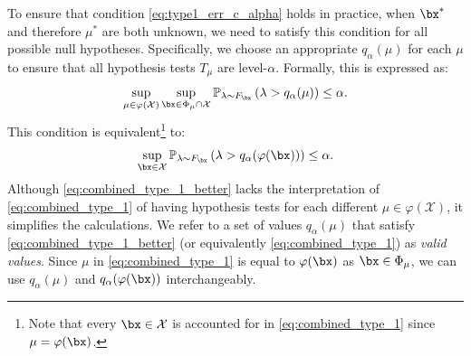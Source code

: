\documentclass[11pt]{article}
\numberwithin{equation}{section}
\numberwithin{figure}{section}
\begin{document}
To ensure that condition \eqref{eq:type1_err_c_alpha} holds in practice, when $\bx^*$ and therefore $\mu^*$ are both unknown, we need to satisfy this condition for all possible null hypotheses.
Specifically, we choose an appropriate $q_\alpha(\mu)$ for each $\mu$ to ensure that all hypothesis tests $T_\mu$ are level-$\alpha$.
Formally, this is expressed as:
\begin{equation} \label{eq:combined_type_1}
   \sup_{\mu \in \varphi(\mathcal X)} \sup_{\bx \in \Phi_\mu \cap \mathcal{X}} \mathbb{P}_{\lambda \sim F_{\bx}} \left(\lambda> q_\alpha(\mu) \right) \leq \alpha.
\end{equation}
This condition is equivalent\footnote{
Note that every $\bx \in \mathcal{X}$ is accounted for in \eqref{eq:combined_type_1} since $\mu = \varphi(\bx)$. 
} to: 
\begin{equation} \label{eq:combined_type_1_better}
  \sup_{\bx \in \mathcal{X}} \mathbb{P}_{\lambda \sim F_{\bx}} \left(\lambda> q_\alpha(\varphi(\bx)) \right) \leq \alpha.
\end{equation}
Although \eqref{eq:combined_type_1_better} lacks the interpretation of \eqref{eq:combined_type_1} of having hypothesis tests for each different $\mu \in \varphi(\mathcal{X})$, it simplifies the calculations. 
We refer to a set of values $q_\alpha(\mu)$ that satisfy \eqref{eq:combined_type_1_better} (or equivalently \eqref{eq:combined_type_1}) as \emph{valid values}. 
Since $\mu$ in \eqref{eq:combined_type_1} is equal to $\varphi(\bx)$ as $\bx \in \Phi_\mu$, we can use $q_\alpha(\mu)$ and $q_\alpha(\varphi(\bx))$ interchangeably.
\end{document}
